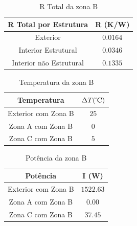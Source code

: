 \documentclass[12pt, a4paper]{article}
\begin{document}
\vspace{15mm}

\begin{table}[htpb]
	\begin{center}
		\begin{tabular}{c c}
			\toprule
			R Total por Estrutura									 & 	R (K/W)  \\
			\midrule
			 Exterior			               				     & $0.0164$		 \\
			 Interior Estrutural             	   			 & $0.0346$		 \\
			 Interior n\~ao Estrutural          		 & $0.1335$		 \\
			\bottomrule
		\end{tabular}
	\end{center}
	\caption{R Total da zona B}\label{tab:seccaoBtotal}
\end{table}

\vspace{15mm}

\begin{table}[htpb]
	\begin{center}
		\begin{tabular}{c c}
			\toprule
			Temperatura    										 & 	$\Delta T(\celsius)$    \\
			\midrule
			 Exterior	com Zona B		               	     & $25$	 \\
			 Zona A com Zona B            	   				 & $0$		 \\
			 Zona C com Zona B          					 & $5$		 \\
			\bottomrule
		\end{tabular}
	\end{center}
	\caption{Temperatura da zona B}\label{tab:seccaoBtemp}
\end{table}

\pagebreak

\begin{table}[htpb]
	\begin{center}
		\begin{tabular}{c c}
			\toprule
			Potência   										 & 	I (W) \\
			\midrule
			 Exterior	com Zona B		               	     & $1522.63$	 \\
			 Zona A com Zona B             	   			 & $0.00$		 \\
			 Zona C com Zona B         					 & $37.45$		 \\
			\bottomrule
		\end{tabular}
	\end{center}
	\caption{Potência da zona B}\label{tab:seccaoBpot}
\end{table}
\end{document}
